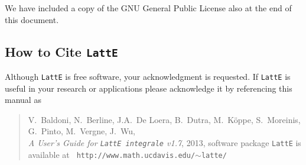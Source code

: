 \documentclass{article}
\newcommand{\latte}{{\tt LattE}\xspace}
\newcommand{\latteV}{v1.7}
\begin{document}
We have included a copy of the GNU General Public License also at the
end of this document.

\subsection{How to Cite {\tt LattE}}

Although {\tt LattE} is free software, your acknowledgment
is requested.  If {\tt LattE} is useful in your research or
applications please acknowledge it by referencing this manual as

\begin{quote}
  V.~Baldoni, N.~Berline, J.A.~De Loera, B.~Dutra, M.~K\"oppe, S.~Moreinis,
  G.~Pinto, M.~Vergne, J.~Wu,
  \\
  {\em A User's Guide for {\tt LattE integrale} \latteV}, 2013, software
  package \latte is available at {\tt
    http://www.math.ucdavis.edu/$\sim$latte/}
\end{quote}
\end{document}
